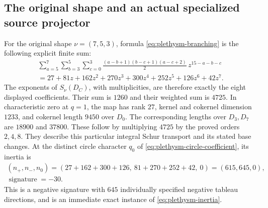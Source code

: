 \subsection{The original shape and an actual specialized source projector}

For the original shape $\nu=(7,5,3)$, formula
\eqref{eq:plethysm-branching} is the following explicit finite sum:
\begin{gather*}
 \sum_{a=5}^{7}\sum_{b=3}^{5}\sum_{c=0}^{3}
 \frac{(a-b+1)(b-c+1)(a-c+2)}2\,z^{15-a-b-c}\\
 =27+81z+162z^2+270z^3+300z^4+252z^5+126z^6+42z^7.
\end{gather*}
The exponents of $S_\nu(D_C)$, with multiplicities, are therefore
exactly the eight displayed coefficients. Their sum is $1260$ and
their weighted sum is $4725$. In characteristic zero at $q=1$,
the map has rank $27$, kernel and cokernel dimension $1233$, and
cokernel length $9450$ over $D_0$. The corresponding lengths over
$D_3,D_7$ are $18900$ and $37800$. These follow by multiplying
$4725$ by the proved orders $2,4,8$. They describe this particular
integral Schur transport and its stated base changes.
At the distinct circle character $q_0$ of
\eqref{eq:plethysm-circle-coefficient}, its inertia is
\begin{gather*}
 (n_+,n_-,n_0)
 =(27+162+300+126,\ 81+270+252+42,\ 0)=(615,645,0),\\
 \operatorname{signature}=-30.
\end{gather*}
This is a negative signature with $645$ individually specified
negative tableau directions, and is an immediate exact instance of
\eqref{eq:plethysm-inertia}.

